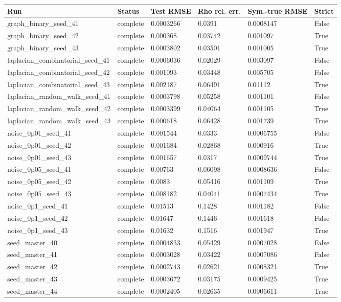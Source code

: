 \begin{tabular}{llllll}
\hline
Run & Status & Test RMSE & Rho rel. err. & Sym.-true RMSE & Strict \\
\hline
graph\_binary\_seed\_41 & complete & 0.0003266 & 0.0391 & 0.0008147 & False \\
graph\_binary\_seed\_42 & complete & 0.000368 & 0.03742 & 0.001097 & True \\
graph\_binary\_seed\_43 & complete & 0.0003802 & 0.03501 & 0.001005 & True \\
laplacian\_combinatorial\_seed\_41 & complete & 0.0006036 & 0.02029 & 0.003097 & False \\
laplacian\_combinatorial\_seed\_42 & complete & 0.001093 & 0.03448 & 0.005705 & False \\
laplacian\_combinatorial\_seed\_43 & complete & 0.002187 & 0.06491 & 0.01112 & True \\
laplacian\_random\_walk\_seed\_41 & complete & 0.0003798 & 0.05258 & 0.001101 & False \\
laplacian\_random\_walk\_seed\_42 & complete & 0.0003399 & 0.04064 & 0.001105 & True \\
laplacian\_random\_walk\_seed\_43 & complete & 0.000618 & 0.06428 & 0.001739 & True \\
noise\_0p01\_seed\_41 & complete & 0.001544 & 0.0333 & 0.0006755 & False \\
noise\_0p01\_seed\_42 & complete & 0.001684 & 0.02868 & 0.000916 & True \\
noise\_0p01\_seed\_43 & complete & 0.001657 & 0.0317 & 0.0009744 & True \\
noise\_0p05\_seed\_41 & complete & 0.00763 & 0.06098 & 0.0008636 & False \\
noise\_0p05\_seed\_42 & complete & 0.0083 & 0.05416 & 0.001109 & True \\
noise\_0p05\_seed\_43 & complete & 0.008182 & 0.04041 & 0.0007434 & True \\
noise\_0p1\_seed\_41 & complete & 0.01513 & 0.1428 & 0.001182 & False \\
noise\_0p1\_seed\_42 & complete & 0.01647 & 0.1446 & 0.001618 & False \\
noise\_0p1\_seed\_43 & complete & 0.01632 & 0.1516 & 0.001947 & True \\
seed\_master\_40 & complete & 0.0004833 & 0.05429 & 0.0007028 & False \\
seed\_master\_41 & complete & 0.0003028 & 0.03422 & 0.0007086 & False \\
seed\_master\_42 & complete & 0.0002743 & 0.02621 & 0.0008321 & True \\
seed\_master\_43 & complete & 0.0003672 & 0.03175 & 0.0009425 & True \\
seed\_master\_44 & complete & 0.0002405 & 0.02635 & 0.0006611 & True \\
\hline
\end{tabular}
